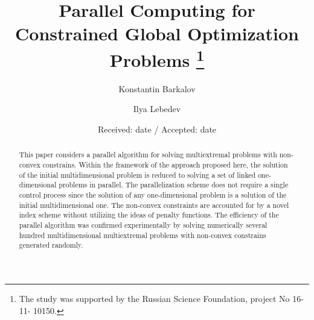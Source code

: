 \documentclass[smallextended]{svjour3}       %
\begin{document}
\title{Parallel Computing for Constrained Global Optimization Problems
\thanks{The study was supported by the Russian Science Foundation, project No 16-11-
10150.}
}


\author{Konstantin Barkalov          \and
        Ilya Lebedev %
}




\date{Received: date / Accepted: date}


\maketitle

\begin{abstract}
This paper considers a parallel algorithm for solving multiextremal problems with non-convex 
constrains. Within the framework of the approach proposed here, the solution of the initial 
multidimensional problem is reduced to solving a set of linked one-dimensional problems in 
parallel. The parallelization scheme does not require a single control process since the solution of 
any one-dimensional problem is a solution of the initial multidimensional one. The non-convex 
constraints are accounted for by a novel index scheme without utilizing the ideas of penalty 
functions. The efficiency of the parallel algorithm was confirmed experimentally by solving 
numerically several hundred multidimensional multiextremal problems with non-convex 
constrains generated randomly.
\end{abstract}
\end{document}
